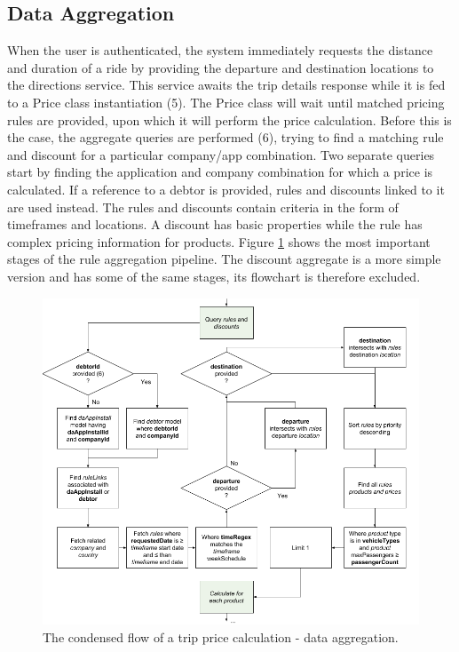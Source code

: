 \subsection{Data Aggregation}
When the user is authenticated, the system immediately requests the distance and duration of a ride by providing the departure and destination locations to the directions service. This service awaits the trip details response while it is fed to a Price class instantiation (5). The Price class will wait until matched pricing rules are provided, upon which it will perform the price calculation. Before this is the case, the aggregate queries are performed (6), trying to find a matching rule and discount for a particular company/app combination. Two separate queries start by finding the application and company combination for which a price is calculated. If a reference to a debtor is provided, rules and discounts linked to it are used instead. The rules and discounts contain criteria in the form of timeframes and locations. A discount has basic properties while the rule has complex pricing information for products. Figure \ref{fig:Data Aggregation} shows the most important stages of the rule aggregation pipeline. The discount aggregate is a more simple version and has some of the same stages, its flowchart is therefore excluded.

\begin{figure}[H]
	\centering
	\includegraphics[width=1\textwidth]{DataAggregation}
	\caption[Data Aggregation]{The condensed flow of a trip price calculation - data aggregation.}
	\label{fig:Data Aggregation}
\end{figure}

